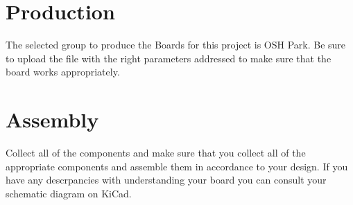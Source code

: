 \documentclass[12pt, letterpaper]{article}
\begin{document}
\section{Production}
The selected group to produce the Boards for this project is OSH Park. Be sure to upload the file with the right parameters addressed to make sure that the board works appropriately.

\section{Assembly}
Collect all of the components and make sure that you collect all of the appropriate components and assemble them in accordance to your design. If you have any descrpancies with understanding your board you can consult your schematic diagram on KiCad.
\end{document}
